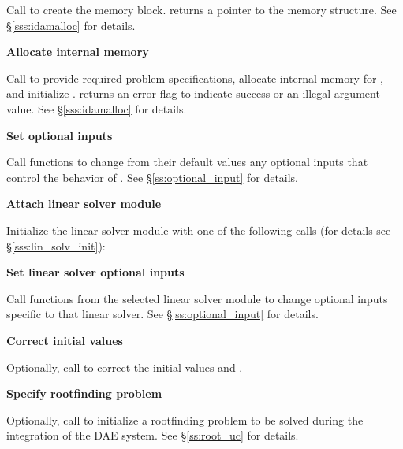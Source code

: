 \begin{Steps}
  Call \id{();} 
  to create the {\ida} memory block.
   returns a pointer to the {\ida} memory structure.
  See \S\ref{sss:idamalloc} for details.

\item\label{i:ida_malloc} 
  {\bf Allocate internal memory}

  Call  
  to provide required problem specifications,
  allocate internal memory for {\ida}, 
  and initialize {\ida}.
   returns an error flag to indicate success or an illegal argument value.
  See \S\ref{sss:idamalloc} for details.
  
\item
  {\bf Set optional inputs}

  Call  functions to change from their default values any
  optional inputs that control the behavior of {\ida}.
  See \S\ref{ss:optional_input} for details.

\item\label{i:lin_solver} 
  {\bf Attach linear solver module}

  Initialize the linear solver module
  with one of the following calls (for details see \S\ref{sss:lin_solv_init}):

  {\s} 

  {\s} 




\item
  {\bf Set linear solver optional inputs}

  Call  functions from the selected linear solver module to
  change optional inputs specific to that linear solver.
  See \S\ref{ss:optional_input} for details.

\item 
  {\bf Correct initial values}

  Optionally, call  to correct the initial values
   and .

\item
  {\bf Specify rootfinding problem}

  Optionally, call  to initialize a rootfinding problem
  to be solved during the integration of the DAE system.
  See \S\ref{ss:root_uc} for details.


\end{Steps}

